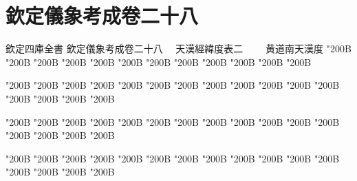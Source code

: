 \chapter*{欽定儀象考成卷二十八}
\begin{正文}
欽定四庫全書
欽定儀象考成卷二十八
　天漢經緯度表二
　　黄道南天漢度
\char"200B\relax{}
\char"200B\relax{}
\char"200B\relax{}
\char"200B\relax{}
\char"200B\relax{}
\char"200B\relax{}
\char"200B\relax{}
\char"200B\relax{}
\char"200B\relax{}
\char"200B\relax{}
\char"200B\relax{}
\char"200B\relax
\par
\end{正文}\clearpage
{}
\begin{正文}
\char"200B\relax{}
\char"200B\relax{}
\char"200B\relax{}
\char"200B\relax{}
\char"200B\relax{}
\char"200B\relax{}
\char"200B\relax{}
\char"200B\relax{}
\char"200B\relax{}
\char"200B\relax{}
\char"200B\relax{}
\char"200B\relax{}
\char"200B\relax{}
\char"200B\relax{}
\char"200B\relax{}
\char"200B\relax
{}\par
\end{正文}\clearpage
{}
\begin{正文}
\char"200B\relax{}
\char"200B\relax{}
\char"200B\relax{}
\char"200B\relax{}
\char"200B\relax{}
\char"200B\relax{}
\char"200B\relax{}
\char"200B\relax{}
\char"200B\relax{}
\char"200B\relax{}
\char"200B\relax{}
\char"200B\relax{}
\char"200B\relax{}
\char"200B\relax{}
\char"200B\relax{}
\char"200B\relax
{}\par
\end{正文}\clearpage
{}
\begin{正文}
\char"200B\relax{}
\char"200B\relax{}
\char"200B\relax{}
\char"200B\relax{}
\char"200B\relax{}
\char"200B\relax{}
\char"200B\relax{}
\char"200B\relax{}
\char"200B\relax{}
\char"200B\relax{}
\char"200B\relax{}
\char"200B\relax{}
\char"200B\relax{}
\char"200B\relax{}
\char"200B\relax{}
\char"200B\relax
{}\par
\end{正文}\clearpage
